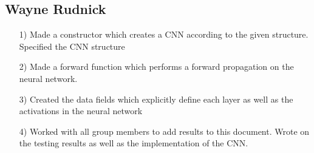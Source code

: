 \documentclass{article}
\begin{document}
\subsection{Wayne Rudnick}
\begin{itemize}
    \item[1)] Made a constructor which creates a CNN according to the given structure. Specified the CNN structure
    \item[2)] Made a forward function which performs a forward propagation on the neural network.
    \item[3)] Created the data fields which explicitly define each layer as well as the activations in the neural network
    \item[4)] Worked with all group members to add results to this document. Wrote on the testing results as well as the implementation of the CNN.
\end{itemize}
\end{document}
